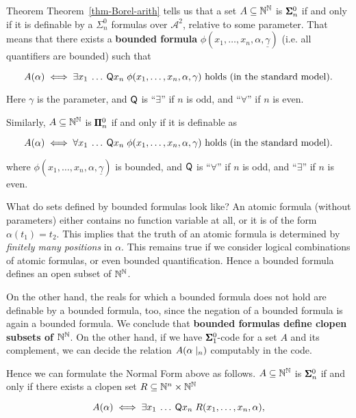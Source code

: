 Theorem Theorem~\ref{thm-Borel-arith} tells us that a set $A \subseteq \mathbb{N}^{\mathbb{N}}$ is $\pmb{\Sigma}^0_n$ if and only if it is definable by a $\Sigma^0_n$ formulas over $\mathcal{A}^2$, relative to some parameter. That means that there exists a \textbf{bounded formula} $\phi(x_1, \dots, x_n,\alpha,\underline{\gamma})$ (i.e. all quantifiers are bounded) such that

\begin{equation}
A(\alpha) \iff \exists x_1 \: \dots \: \mathsf{Q} x_n \; \phi(x_1, \dots, x_n, \alpha,\gamma) \text{ holds (in the standard model).}
\end{equation}

Here $\gamma$ is the parameter, and $\mathsf{Q}$ is ``$\exists$'' if $n$ is odd, and ``$\forall$'' if $n$ is even.

Similarly, $A \subseteq \mathbb{N}^{\mathbb{N}}$ is $\pmb{\Pi}^0_n$ if and only if it is definable as

\begin{equation}
A(\alpha) \iff \forall x_1 \: \dots \:  \mathsf{Q} x_n \; \phi(x_1, \dots, x_n, \alpha,\gamma) \text{ holds (in the standard model).}
\end{equation}

where $\phi(x_1, \dots, x_n,\alpha,\underline{\gamma})$ is bounded, and $\mathsf{Q}$ is ``$\forall$'' if $n$ is odd, and ``$\exists$'' if $n$ is even.

What do sets defined by bounded formulas look like? An atomic formula (without parameters) either contains no function variable at all, or it is of the form $\alpha(t_1) = t_2$. This implies that the truth of an atomic formula is determined by \textit{finitely many positions} in $\alpha$. This remains true if we consider logical combinations of atomic formulas, or even bounded quantification. Hence a bounded formula defines an open subset of $\mathbb{N}^{\mathbb{N}}$.

On the other hand, the reals for which a bounded formula does not hold are definable by a bounded formula, too, since the negation of a bounded formula is again a bounded formula. We conclude that \textbf{bounded formulas define clopen subsets of $\mathbb{N}^{\mathbb{N}}$}. On the other hand, if we have $\pmb{\Sigma}^0_1$-code for a set $A$ and its complement, we can decide the relation $A(\alpha\mid_{n})$ computably in the code.

Hence we can formulate the Normal Form above as follows.
$A \subseteq \mathbb{N}^{\mathbb{N}}$ is $\pmb{\Sigma}^0_n$ if and only if there exists a clopen set $R \subseteq \mathbb{N}^n\times \mathbb{N}^{\mathbb{N}}$

\begin{equation}
A(\alpha) \iff \exists x_1 \: \dots \: \mathsf{Q} x_n \; R(x_1, \dots, x_n, \alpha),
\end{equation}

